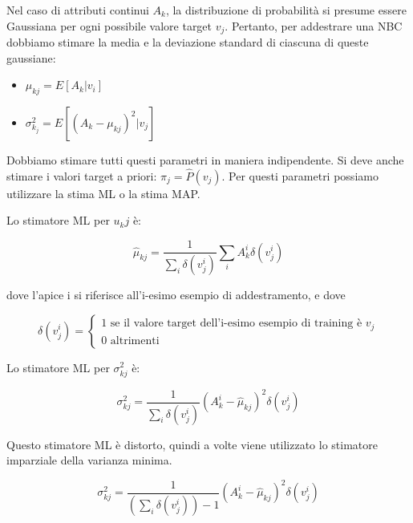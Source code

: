 \documentclass[a4paper]{extarticle}
\begin{document}
Nel caso di attributi continui $A_k$, la distribuzione di probabilità si presume essere Gaussiana per ogni possibile valore target $v_j$. Pertanto, per addestrare una NBC dobbiamo stimare la media e la deviazione standard di ciascuna di queste gaussiane:

\begin{itemize}
\item $\mu_{kj} = E[A_k|v_i] $
\item $\sigma_{k_j}^2 = E[(A_k - \mu_{kj})^2|v_j]$
\end{itemize}

Dobbiamo stimare tutti questi parametri in maniera indipendente. Si deve anche stimare i valori target a priori: $\pi_j = \hat P(v_j)$. Per questi parametri possiamo utilizzare la stima ML o la stima MAP. 

Lo stimatore ML per $u_kj$ è:

\begin{equation*}
\hat \mu_{kj} = \dfrac{1}{\sum\limits_i \delta(v_j^i)} \sum\limits_i A_k^i \delta(v_j^i)
\end{equation*} 

dove l'apice i si riferisce all'i-esimo esempio di addestramento, e dove

\begin{equation*}
\delta(v_j^i) = 
\begin{cases}
		1 \text{ se il valore target dell'i-esimo esempio di training è } v_j \\
		0 \text{ altrimenti}
	\end{cases}
\end{equation*}

Lo stimatore ML per $\sigma_{kj}^2$ è:

\begin{equation*}
\sigma_{kj}^2 = \dfrac{1}{\sum\limits_i \delta(v_j^i)} (A_k^i - \hat \mu_{kj})^2 \delta(v_j^i)
\end{equation*}

Questo stimatore ML è distorto, quindi a volte viene utilizzato lo stimatore imparziale della varianza minima.

\begin{equation*}
\sigma_{kj}^2 = \dfrac{1}{(\sum\limits_i \delta(v_j^i))-1} (A_k^i - \hat \mu_{kj})^2 \delta(v_j^i)
\end{equation*}
\end{document}
